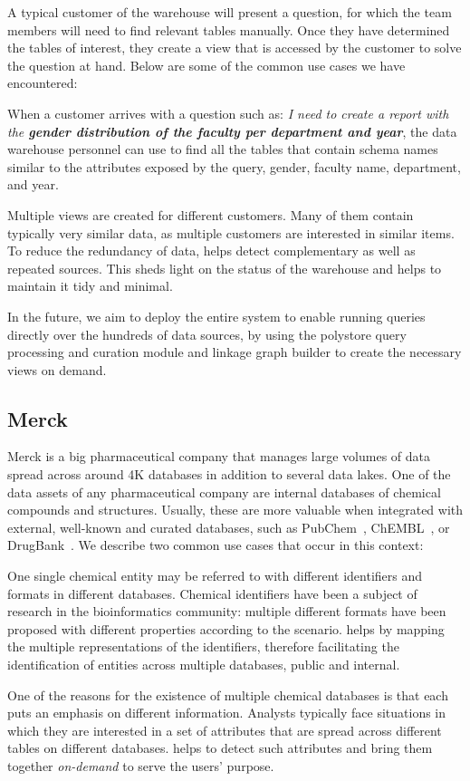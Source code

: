 A typical customer of the warehouse will present a question, for which the team members will need to find relevant tables manually. Once they have determined the tables of interest, they create a view that is accessed by the customer to solve the question at hand. Below are some of the common use cases we have encountered:

 When a customer arrives with a question such as: \emph{I need to create a report with the \textbf{gender distribution of the faculty per department and year}}, the data warehouse personnel can use \dcv to find all the tables that contain schema names similar to the attributes exposed by the query, \eg gender, faculty name, department, and year.

 Multiple views are created for different customers. Many of them contain typically very similar data, as multiple customers are interested in similar items. To reduce the redundancy of data, \dcv helps  detect complementary as well as repeated sources. This sheds light on the status of the warehouse and helps to maintain it tidy and minimal.

In the future, we aim to deploy the entire \dcv system to enable running queries directly over the hundreds of data sources, by using the polystore query processing and curation module and linkage graph builder to create the necessary views on demand. 

\subsection{Merck}


Merck is a big pharmaceutical company that manages large volumes of data spread across around 4K databases in addition to several data lakes. 
One of the data assets of any pharmaceutical company are internal databases of chemical compounds and structures. Usually, these are more valuable when integrated with external, well-known and curated databases, such as PubChem~\cite{pubchem}, ChEMBL~\cite{ChEMBL}, or DrugBank~\cite{DrugBank}. We describe two common use cases that occur in this context:


 One single chemical entity may be referred to with different identifiers and formats in different databases. Chemical identifiers have been a subject of research in the bioinformatics community: multiple different formats have been proposed with different properties according to the scenario. \dcv helps by mapping the multiple representations of the identifiers, therefore facilitating the identification of entities across multiple databases, public and internal.



 One of the reasons for the existence of multiple chemical databases is that each puts an emphasis on different information. Analysts typically face situations in which they are interested in a set of attributes that are spread across different tables on different databases. \dcv helps to detect such attributes and bring them together \emph{on-demand}  to serve the users' purpose.

